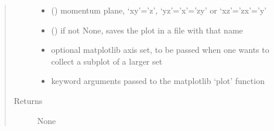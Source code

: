 \documentclass[letterpaper,10pt,english]{sphinxmanual}
\begin{document}
\begin{fulllineitems}
\begin{quote}
\begin{description}
\begin{itemize}
\item {} 
\sphinxAtStartPar
{} () \textendash{} momentum plane, ‘xy’=’z’, ‘yz’=’x’=’zy’ or ‘xz’=’zx’=’y’

\item {} 
\sphinxAtStartPar
{} () \textendash{} if not None, saves the plot in a file with that name

\item {} 
\sphinxAtStartPar
{} \textendash{} optional matplotlib axis set, to be passed when one wants to collect a subplot of a larger set

\item {} 
\sphinxAtStartPar
{} \textendash{} keyword arguments passed to the matplotlib ‘plot’ function

\end{itemize}

\item[{Returns}] \leavevmode
\sphinxAtStartPar
None

\end{description}\end{quote}

\end{fulllineitems}

\end{document}
